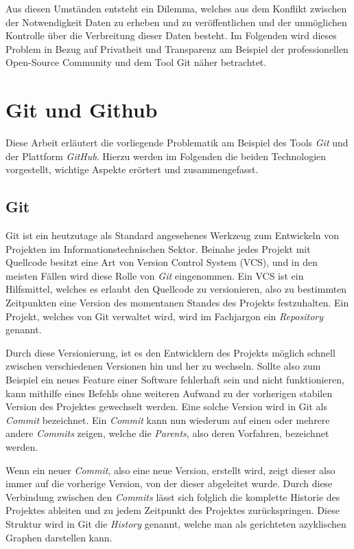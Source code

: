 \documentclass[12pt,a4paper]{scrartcl}
\begin{document}
Aus diesen Umständen entsteht ein Dilemma, welches aus dem Konflikt zwischen der Notwendigkeit Daten zu erheben und zu veröffentlichen und der unmöglichen Kontrolle über die Verbreitung dieser Daten besteht.
Im Folgenden wird dieses Problem in Bezug auf Privatheit und Transparenz am Beispiel der professionellen Open-Source Community und dem Tool Git näher betrachtet.

\section{Git und Github}
Diese Arbeit erläutert die vorliegende Problematik am Beispiel des Tools \emph{Git} und der Plattform \emph{GitHub}.
Hierzu werden im Folgenden die beiden Technologien vorgestellt, wichtige Aspekte erörtert und zusammengefasst.


\subsection{Git}
Git ist ein heutzutage als Standard angesehenes Werkzeug zum Entwickeln von Projekten im Informationstechnischen Sektor.
Beinahe jedes Projekt mit Quellcode besitzt eine Art von Version Control System (VCS), und in den meisten Fällen wird diese Rolle von \emph{Git} eingenommen.
Ein VCS ist ein Hilfsmittel, welches es erlaubt den Quellcode zu versionieren, also zu bestimmten Zeitpunkten eine Version des momentanen Standes des Projekts festzuhalten.
Ein Projekt, welches von Git verwaltet wird, wird im Fachjargon ein \emph{Repository} genannt.

Durch diese Versionierung, ist es den Entwicklern des Projekts möglich schnell zwischen verschiedenen Versionen hin und her zu wechseln.
Sollte also zum Beispiel ein neues Feature einer Software fehlerhaft sein und nicht funktionieren, kann mithilfe eines Befehls ohne weiteren Aufwand zu der vorherigen stabilen Version des Projektes gewechselt werden.
Eine solche Version wird in Git als \emph{Commit} bezeichnet.
Ein \emph{Commit} kann nun wiederum auf einen oder mehrere andere \emph{Commits} zeigen, welche die \emph{Parents}, also deren Vorfahren, bezeichnet werden.

Wenn ein neuer \emph{Commit}, also eine neue Version, erstellt wird, zeigt dieser also immer auf die vorherige Version, von der dieser abgeleitet wurde.
Durch diese Verbindung zwischen den \emph{Commits} lässt sich folglich die komplette Historie des Projektes ableiten und zu jedem Zeitpunkt des Projektes zurückspringen.
Diese Struktur wird in Git die \emph{History} genannt, welche man als gerichteten azyklischen Graphen darstellen kann.
\end{document}
